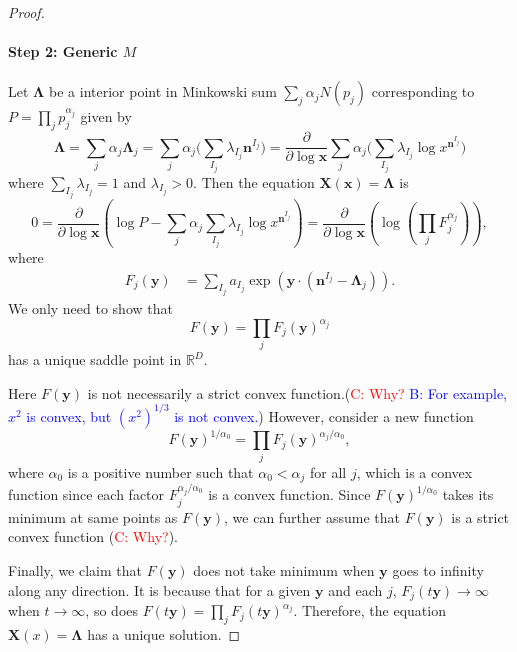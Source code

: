 \documentclass[12pt]{article}
\theoremstyle{definition}
\theoremstyle{plain}
\begin{document}
\begin{proof}
	\paragraph{Step 2: Generic $M$} Let $\mathbf{\Lambda}$ be a interior point in Minkowski sum $\sum_j \alpha_j N(p_{j})$ corresponding to $P=\prod_j p_{j}^{\alpha_{j}}$ given by 
	\[
		\mathbf{\Lambda}
		=\sum_j \alpha_j \mathbf{\Lambda}_j
		=\sum_j \alpha_{j} \biggl(\sum_{I_j}\lambda_{I_j}\mathbf{n}^{I_j}\biggr)
		=\frac{\partial}{\partial \log \mathbf{x}}\sum_{j}\alpha_j\biggl( \sum_{I_j}\lambda_{I_j} \log x^{\mathbf n^{I_j}}\biggr)
	\]
	where $\sum_{I_j} \lambda_{I_j}=1$ and $\lambda_{I_j} > 0$. Then the equation $\mathbf{X}(\mathbf{x})=\mathbf{\Lambda}$ is 
	\[
		0=\frac{\partial }{\partial \log \mathbf{x}}\left(
			\log P-\sum_{j}\alpha_j\sum_{I_j}\lambda_{I_j} \log x^{\mathbf n^{I_j}}
		\right)=\frac{\partial }{\partial \log \mathbf{x}}\left(
		\log \left(\prod_j F_{j}^{\alpha_{j}}\right)
		\right),
	\]
	where
	\[
		\begin{aligned}
			F_j(\mathbf y)&=\sum_{I_{j}} a_{I_{j}} \exp\left(\mathbf{y}\cdot \left(\mathbf{n}^{I_j}-\mathbf{\Lambda}_j\right)\right).
		\end{aligned}
	\]	
	We only need to show that
	\[
		F(\mathbf y)=\prod_j F_j(\mathbf{y})^{\alpha_j}	
	\]
	has a unique saddle point in $\mathds{R}^D$.
	
	Here $F(\mathbf y)$ is not necessarily a strict convex function.(\textcolor{red}{C: Why?} \textcolor{blue}{B: For example, $x^2$ is convex, but $(x^2)^{1/3}$ is not convex.}) However, consider a new function
	\[
		F(\mathbf y)^{1/\alpha_0}=\prod_j F_j(\mathbf y)^{\alpha_j/\alpha_0},
	\]
	where $\alpha_0$ is a positive number such that $\alpha_0< \alpha_j$ for all $j$, which is a convex function 
	since each factor $F_{j}^{\alpha_{j}/\alpha_{0}}$ is a convex function. Since $F(\mathbf y)^{1/\alpha_0}$ takes its minimum at same points as $F(\mathbf y)$, 
	we can further assume that $F(\mathbf y)$ is a strict convex function (\textcolor{red}{C: Why?}). 
	
	Finally, we claim that $F(\mathbf y)$ does not take minimum when $\mathbf{y}$ goes to infinity 
	along any direction. It is because that for a given $\mathbf{y}$ and each $j$, $F_j(t\mathbf{y})\to \infty$ when $t\to \infty$,
	so does $F(t\mathbf{y})=\prod_j F_j(t\mathbf{y})^{\alpha_j}$. Therefore, the equation $\mathbf{X}(x)=\mathbf{\Lambda}$ has a unique solution.
	\end{proof}
	












\end{document}
